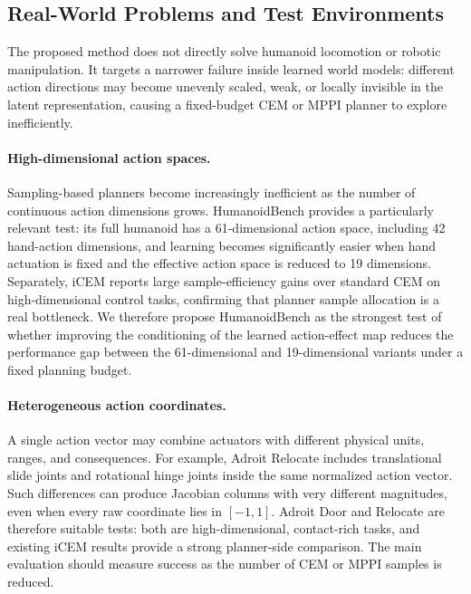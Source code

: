 ﻿\documentclass{article}
\begin{document}
\subsection{Real-World Problems and Test Environments}

The proposed method does not directly solve humanoid locomotion or robotic
manipulation. It targets a narrower failure inside learned world models:
different action directions may become unevenly scaled, weak, or locally
invisible in the latent representation, causing a fixed-budget CEM or MPPI
planner to explore inefficiently.

\paragraph{High-dimensional action spaces.}
Sampling-based planners become increasingly inefficient as the number of
continuous action dimensions grows. HumanoidBench provides a particularly
relevant test: its full humanoid has a 61-dimensional action space, including
42 hand-action dimensions, and learning becomes significantly easier when hand
actuation is fixed and the effective action space is reduced to 19 dimensions.
Separately, iCEM reports large sample-efficiency gains over standard CEM on
high-dimensional control tasks, confirming that planner sample allocation is a
real bottleneck. We therefore propose HumanoidBench as the strongest test of
whether improving the conditioning of the learned action-effect map reduces the
performance gap between the 61-dimensional and 19-dimensional variants under a
fixed planning budget.

\paragraph{Heterogeneous action coordinates.}
A single action vector may combine actuators with different physical units,
ranges, and consequences. For example, Adroit Relocate includes translational
slide joints and rotational hinge joints inside the same normalized action
vector. Such differences can produce Jacobian columns with very different
magnitudes, even when every raw coordinate lies in $[-1,1]$. Adroit Door and
Relocate are therefore suitable tests: both are high-dimensional,
contact-rich tasks, and existing iCEM results provide a strong planner-side
comparison. The main evaluation should measure success as the number of CEM or
MPPI samples is reduced.
\end{document}

